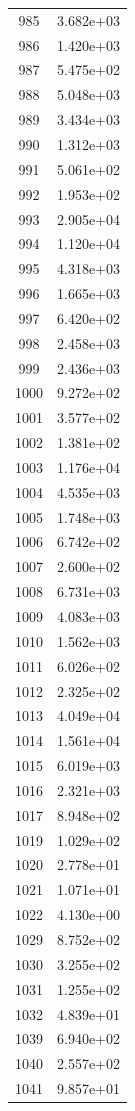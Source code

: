 \documentclass[12pt]{article}
\begin{document}
\begin{longtable}{@{}cc@{}}
985 & 3.682e+03 \\
986 & 1.420e+03 \\
987 & 5.475e+02 \\
988 & 5.048e+03 \\
989 & 3.434e+03 \\
990 & 1.312e+03 \\
991 & 5.061e+02 \\
992 & 1.953e+02 \\
993 & 2.905e+04 \\
994 & 1.120e+04 \\
995 & 4.318e+03 \\
996 & 1.665e+03 \\
997 & 6.420e+02 \\
998 & 2.458e+03 \\
999 & 2.436e+03 \\
1000 & 9.272e+02 \\
1001 & 3.577e+02 \\
1002 & 1.381e+02 \\
1003 & 1.176e+04 \\
1004 & 4.535e+03 \\
1005 & 1.748e+03 \\
1006 & 6.742e+02 \\
1007 & 2.600e+02 \\
1008 & 6.731e+03 \\
1009 & 4.083e+03 \\
1010 & 1.562e+03 \\
1011 & 6.026e+02 \\
1012 & 2.325e+02 \\
1013 & 4.049e+04 \\
1014 & 1.561e+04 \\
1015 & 6.019e+03 \\
1016 & 2.321e+03 \\
1017 & 8.948e+02 \\
1019 & 1.029e+02 \\
1020 & 2.778e+01 \\
1021 & 1.071e+01 \\
1022 & 4.130e+00 \\
1029 & 8.752e+02 \\
1030 & 3.255e+02 \\
1031 & 1.255e+02 \\
1032 & 4.839e+01 \\
1039 & 6.940e+02 \\
1040 & 2.557e+02 \\
1041 & 9.857e+01 \\

\end{longtable}
\end{document}
